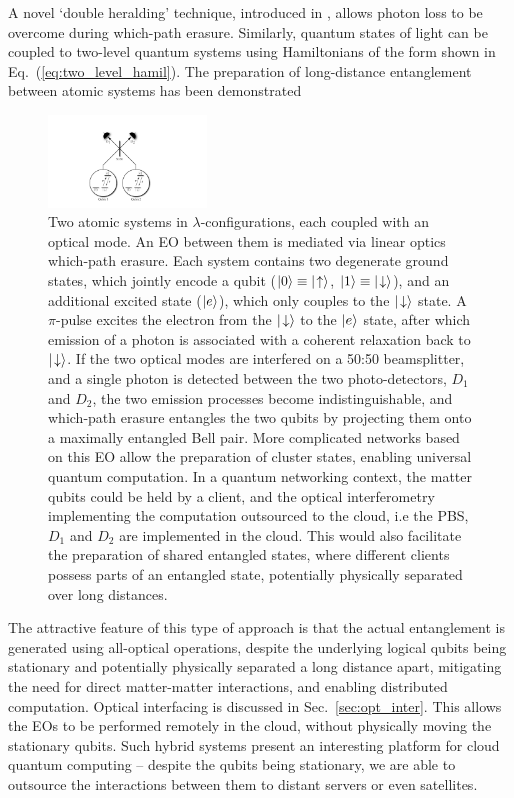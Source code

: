 A novel `double heralding' technique, introduced in \cite{bib:BarrettKok05}, allows photon loss to be overcome during which-path erasure. Similarly, quantum states of light can be coupled to two-level quantum systems using Hamiltonians of the form shown in Eq.~(\ref{eq:two_level_hamil}). The preparation of long-distance entanglement between atomic systems has been demonstrated \cite{bib:Matsukevich05, bib:Matsukevich05b}

\begin{figure}[htpb]
\includegraphics[width=0.375\textwidth]{barrett_kok}
\caption{Two atomic systems in $\lambda$-configurations, each coupled with an optical mode. An EO between them is mediated via linear optics which-path erasure. Each system contains two degenerate ground states, which jointly encode a qubit (\mbox{$|0\rangle\equiv|\!\uparrow\rangle$}, \mbox{$|1\rangle\equiv|\!\downarrow\rangle$}), and an additional excited state ($|e\rangle$), which only couples to the $|\!\downarrow\rangle$ state. A $\pi$-pulse excites the electron from the $|\!\downarrow\rangle$ to the $|e\rangle$ state, after which emission of a photon is associated with a coherent relaxation back to $|\!\downarrow\rangle$. If the two optical modes are interfered on a 50:50 beamsplitter, and a single photon is detected between the two photo-detectors, $D_1$ and $D_2$, the two emission processes become indistinguishable, and which-path erasure entangles the two qubits by projecting them onto a maximally entangled Bell pair. More complicated networks based on this EO allow the preparation of cluster states, enabling universal quantum computation. In a quantum networking context, the matter qubits could be held by a client, and the optical interferometry implementing the computation outsourced to the cloud, i.e the PBS, $D_1$ and $D_2$ are implemented in the cloud. This would also facilitate the preparation of shared entangled states, where different clients possess parts of an entangled state, potentially physically separated over long distances.} \label{fig:barrett_kok}
\end{figure}

The attractive feature of this type of approach is that the actual entanglement is generated using all-optical operations, despite the underlying logical qubits being stationary and potentially physically separated a long distance apart, mitigating the need for direct matter-matter interactions, and enabling distributed computation. Optical interfacing is discussed in Sec.~\ref{sec:opt_inter}. This allows the EOs to be performed remotely in the cloud, without physically moving the stationary qubits. Such hybrid systems present an interesting platform for cloud quantum computing -- despite the qubits being stationary, we are able to outsource the interactions between them to distant servers or even satellites.

